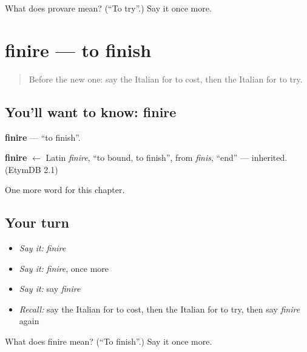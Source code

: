 \begin{tcolorbox}[breakable,colback=teal!4,colframe=teal!35!black,title={Before you move on}]
What does provare mean? (\textquotedblleft{}To try\textquotedblright{}.) Say it once more.
\end{tcolorbox}
\section[finire]{finire — to finish}

\label{lesson:IT-C205-finire}



\begin{quote}
Before the new one: say the Italian for to cost, then the Italian for to try.
\end{quote}

\subsection*{You'll want to know: finire}
\textbf{finire} — \textquotedblleft{}to finish\textquotedblright{}.

\begin{cousinweb}
\textbf{finire} $\leftarrow$ Latin \emph{finire}, \textquotedblleft{}to bound, to finish\textquotedblright{}, from \emph{finis}, \textquotedblleft{}end\textquotedblright{} — inherited. (EtymDB 2.1)
\end{cousinweb}

\begin{grammarlens}[title={What you've built}]
One more word for this chapter.
\end{grammarlens}

\subsection*{Your turn}
\begin{itemize}
\raggedright
  \item \emph{Say it:} \emph{finire}
  \item \emph{Say it:} \emph{finire}, once more
  \item \emph{Say it:} say \emph{finire}
  \item \emph{Recall:} say the Italian for to cost, then the Italian for to try, then say \emph{finire} again
\end{itemize}

\begin{tcolorbox}[breakable,colback=teal!4,colframe=teal!35!black,title={Before you move on}]
What does finire mean? (\textquotedblleft{}To finish\textquotedblright{}.) Say it once more.
\end{tcolorbox}
